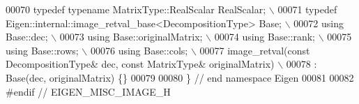 \begin{DoxyCode}
00070 \textcolor{preprocessor}{  typedef typename MatrixType::RealScalar RealScalar; \(\backslash\)}
00071 \textcolor{preprocessor}{  typedef Eigen::internal::image\_retval\_base<DecompositionType> Base; \(\backslash\)}
00072 \textcolor{preprocessor}{  using Base::dec; \(\backslash\)}
00073 \textcolor{preprocessor}{  using Base::originalMatrix; \(\backslash\)}
00074 \textcolor{preprocessor}{  using Base::rank; \(\backslash\)}
00075 \textcolor{preprocessor}{  using Base::rows; \(\backslash\)}
00076 \textcolor{preprocessor}{  using Base::cols; \(\backslash\)}
00077 \textcolor{preprocessor}{  image\_retval(const DecompositionType& dec, const MatrixType& originalMatrix) \(\backslash\)}
00078 \textcolor{preprocessor}{    : Base(dec, originalMatrix) \{\}}
00079 
00080 \} \textcolor{comment}{// end namespace Eigen}
00081 
00082 \textcolor{preprocessor}{#endif // EIGEN\_MISC\_IMAGE\_H}
\end{DoxyCode}
